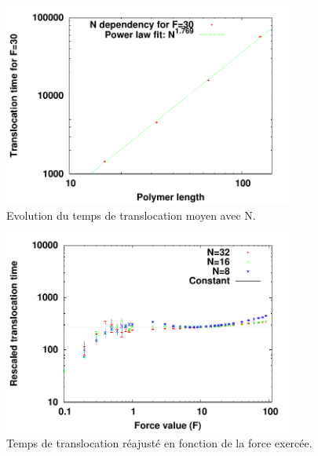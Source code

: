 \begin{figure}[H]
\begin{center}
\includegraphics[width=0.85\textwidth]{ndeppolsimple.pdf}


\caption[Temps de translocation en fonction de N]{Evolution du temps de translocation moyen avec N. }
\label{ndeppolsimple}
\end{center}
\end{figure}

\begin{figure}[H]
\begin{center}
\includegraphics[width=0.85\textwidth]{transloctaufrescsimplepol.pdf}


\caption[Temps de translocation réajusté]{Temps de translocation réajusté en fonction de la force exercée. }
\label{simplepolrescale}
\end{center}
\end{figure}

